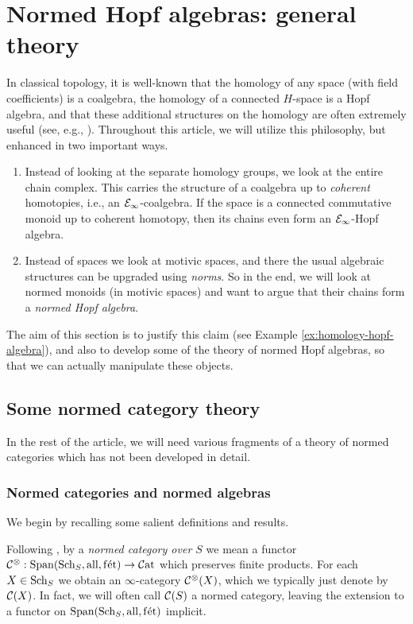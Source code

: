 \documentclass{amsart}
\renewcommand{\NB}[1]{}
\numberwithin{proposition}{section}
\numberwithin{equation}{section}
\def\fet{\mathrm{f\acute et}}
\def\all{\mathrm{all}}
\begin{document}
\section{Normed Hopf algebras: general theory} \label{sec:norm-hopf-1}
In classical topology, it is well-known that the homology of any space (with field coefficients) is a coalgebra, the homology of a connected $H$-space is a Hopf algebra\NB{nonassociative...}, and that these additional structures on the homology are often extremely useful (see, e.g., \cite[\S8.9]{milnor-moore}).
Throughout this article, we will utilize this philosophy, but enhanced in two important ways.
\begin{enumerate}
\item Instead of looking at the separate homology groups, we look at the entire chain complex.
  This carries the structure of a coalgebra up to \emph{coherent} homotopies, i.e., an $\mathcal E_\infty$-coalgebra.
  If the space is a connected commutative monoid up to coherent homotopy, then its chains even form an $\mathcal E_\infty$-Hopf algebra.
\item Instead of spaces we look at motivic spaces, and there the usual algebraic structures can be upgraded using \emph{norms}.
  So in the end, we will look at normed monoids (in motivic spaces) and want to argue that their chains form a \emph{normed Hopf algebra}.
\end{enumerate}
The aim of this section is to justify this claim (see Example \ref{ex:homology-hopf-algebra}), and also to develop some of the theory of normed Hopf algebras, so that we can actually manipulate these objects.

\subsection{Some normed category theory}
In the rest of the article, we will need various fragments of a theory of normed categories which has not been developed in detail.

\subsubsection{Normed categories and normed algebras} \label{subsec:normed-cat}
We begin by recalling some salient definitions and results.

Following \cite{bachmann-norms}, by a \emph{normed category over $S$} we mean a functor $\scr C^\otimes: \Span(\Sch_S, \all,\fet) \to \Cat$ which preserves finite products.
For each $X \in \mathrm{S}\mathrm{ch}{}_S$ we obtain an $\infty$-category $\mathcal C^\otimes(X)$, which we typically just denote by $\mathcal C(X)$.
In fact, we will often call $\mathcal C(S)$ a normed category, leaving the extension to a functor on $\Span(\Sch_S, \all, \fet)$ implicit.
\end{document}
